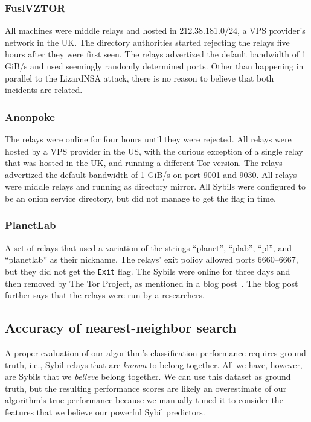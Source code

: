 \subsubsection{FuslVZTOR}
All machines were middle relays and hosted in 212.38.181.0/24, a VPS provider's
network in the UK.  The directory authorities started rejecting the relays five
hours after they were first seen.  The relays advertized the default bandwidth
of 1 GiB/s and used seemingly randomly determined ports.  Other than happening
in parallel to the LizardNSA attack, there is no reason to believe that both
incidents are related.

\subsubsection{Anonpoke}
The relays were online for four hours until they were rejected.  All relays were
hosted by a VPS provider in the US, with the curious exception of a single relay
that was hosted in the UK, and running a different Tor version.  The relays
advertized the default bandwidth of 1 GiB/s on port 9001 and 9030.  All relays
were middle relays and running as directory mirror.  All Sybils were configured
to be an onion service directory, but did not manage to get the flag in time.

\subsubsection{PlanetLab}
A set of relays that used a variation of the strings ``planet'', ``plab'',
``pl'', and ``planetlab'' as their nickname.  The relays' exit policy allowed
ports 6660--6667, but they did not get the \texttt{Exit} flag.  The Sybils were
online for three days and then removed by The Tor Project, as mentioned in a
blog post~\cite{planetlab}.  The blog post further says that the relays were run
by a researchers.

% 

\subsection{Accuracy of nearest-neighbor search}
\label{sec:accuracy}
A proper evaluation of our algorithm's classification performance requires
ground truth, i.e., Sybil relays that are \emph{known} to belong together.  All
we have, however, are Sybils that we \emph{believe} belong together.  We can use
this dataset as ground truth, but the resulting performance scores are likely an
overestimate of our algorithm's true performance because we manually tuned it to
consider the features that we believe our powerful Sybil predictors.

